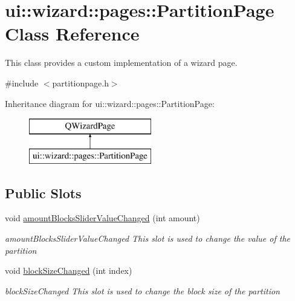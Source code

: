 \hypertarget{classui_1_1wizard_1_1pages_1_1_partition_page}{}\section{ui\+:\+:wizard\+:\+:pages\+:\+:Partition\+Page Class Reference}
\label{classui_1_1wizard_1_1pages_1_1_partition_page}


This class provides a custom implementation of a wizard page.  




{\ttfamily \#include $<$partitionpage.\+h$>$}

Inheritance diagram for ui\+:\+:wizard\+:\+:pages\+:\+:Partition\+Page\+:\begin{figure}[H]
\begin{center}
\leavevmode
\includegraphics[height=2.000000cm]{classui_1_1wizard_1_1pages_1_1_partition_page}
\end{center}
\end{figure}
\subsection*{Public Slots}
\begin{DoxyCompactItemize}
\item 
void \mbox{\hyperlink{classui_1_1wizard_1_1pages_1_1_partition_page_a0160f5f4dd1dcc377dc7a2f1db732f24}{amount\+Blocks\+Slider\+Value\+Changed}} (int amount)
\begin{DoxyCompactList}\small\item\em amount\+Blocks\+Slider\+Value\+Changed This slot is used to change the value of the partition \end{DoxyCompactList}\item 
void \mbox{\hyperlink{classui_1_1wizard_1_1pages_1_1_partition_page_aa90723be1956b54ce182cc64b3b4ce6f}{block\+Size\+Changed}} (int index)
\begin{DoxyCompactList}\small\item\em block\+Size\+Changed This slot is used to change the block size of the partition \end{DoxyCompactList}\end{DoxyCompactItemize}
